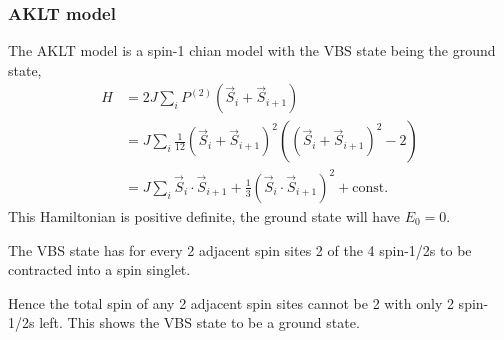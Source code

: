 \documentclass{beamer}
\begin{document}
\begin{frame}
    \frametitle{AKLT model}
    The AKLT model is a spin-1 chian model with the VBS state being the ground state, 
    \begin{align*}
        H &= 2J\sum_i P^{(2)}(\vec{S}_{i} + \vec{S}_{i+1} ) \nonumber \\
          &= J\sum_i \frac{1}{12} (\vec{S}_{i} + \vec{S}_{i+1} )^2 ((\vec{S}_{i} + \vec{S}_{i+1} )^2 -2) \nonumber \\ 
          &= J \sum_i \vec{S}_{i} \cdot \vec{S}_{i+1} + \frac{1}{3} (\vec{S}_{i} \cdot \vec{S}_{i+1})^2 + \text{const.}
    \end{align*}
    \pause 
    This Hamiltonian is positive definite, the ground state will have $E_0 = 0$. \pause
    
    The VBS state has for every 2 adjacent spin sites 2 of the 4 spin-1/2s to be contracted into a spin singlet. \pause 
    
    Hence the total spin of any 2 adjacent spin sites cannot be 2 with only 2 spin-1/2s left. This shows the VBS state to be a ground state.
    

\end{frame}
\end{document}
